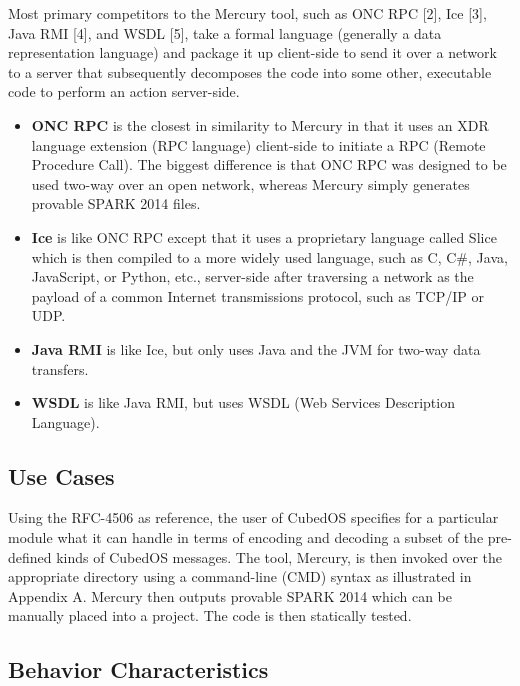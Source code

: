 Most primary competitors to the Mercury tool, such as ONC RPC [2], Ice [3], Java RMI [4], and
WSDL [5], take a formal language (generally a data representation language) and package it up
client-side to send it over a network to a server that subsequently decomposes the code into
some other, executable code to perform an action server-side.

\begin{itemize}
\item \textbf{ONC RPC} is the closest in similarity to Mercury in that it uses an XDR language
extension (RPC language) client-side to initiate a RPC (Remote Procedure Call). The biggest
difference is that ONC RPC was designed to be used two-way over an open network, whereas Mercury
simply generates provable SPARK 2014 files.

\item \textbf{Ice} is like ONC RPC except that it uses a proprietary language called Slice which
is then compiled to a more widely used language, such as C, C\#, Java, JavaScript, or Python,
etc., server-side after traversing a network as the payload of a common Internet transmissions
protocol, such as TCP/IP or UDP.

\item \textbf{Java RMI} is like Ice, but only uses Java and the JVM for two-way data transfers.

\item \textbf{WSDL} is like Java RMI, but uses WSDL (Web Services Description Language).
\end{itemize}

\subsection{Use Cases}

Using the RFC-4506 as reference, the user of CubedOS specifies for a particular module what it
can handle in terms of encoding and decoding a subset of the pre-defined kinds of CubedOS
messages. The tool, Mercury, is then invoked over the appropriate directory using a command-line
(CMD) syntax as illustrated in Appendix A. Mercury then outputs provable SPARK 2014 which can be
manually placed into a project. The code is then statically tested.

\subsection{Behavior Characteristics}

